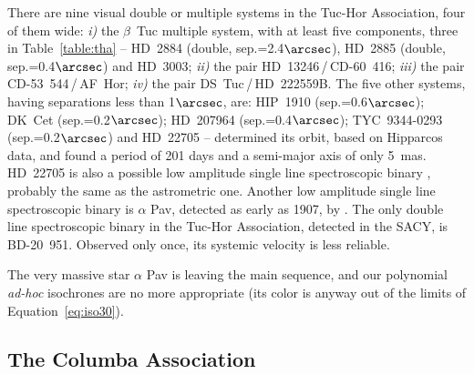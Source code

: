 \documentclass[11pt,twoside]{book}
\begin{document}
There are nine visual double or multiple systems in the Tuc-Hor Association, four of them wide:
{\it i)} the $\beta$~Tuc multiple system, with at least five components, three in Table~\ref{table:tha} --
HD~2884 (double, sep.=2.4$\arcsec$), HD~2885 (double, sep.=0.4$\arcsec$) and HD~3003;
{\it ii)} the pair HD~13246\,/\,CD-60~416;
{\it iii)} the pair CD-53~544\,/\,AF~Hor; {\it iv)} the pair DS~Tuc\,/\,HD~222559B.
The five other systems, having separations less than 1$\arcsec$, are: HIP~1910 (sep.=0.6$\arcsec$);
DK~Cet (sep.=0.2$\arcsec$);  HD~207964 (sep.=0.4$\arcsec$); TYC~9344-0293 (sep.=0.2$\arcsec$)
and HD~22705 --
\citet{makarov07} determined its orbit, based on Hipparcos data,
and found  a period of 201 days and a semi-major axis of only 5~mas.
HD~22705 is also a possible low amplitude single line spectroscopic binary \citep{nord04},
probably the same as the astrometric one.
Another low amplitude single line spectroscopic binary is $\alpha$ Pav,
detected as early as 1907, by \citet{curtis07}.
The only double line spectroscopic binary in the Tuc-Hor Association, detected in the SACY, is BD-20~951.
Observed only once, its systemic velocity is less reliable.

The very massive star $\alpha$ Pav is leaving the main sequence, and
our polynomial {\it ad-hoc} isochrones are no more appropriate (its
color is anyway out of the limits of Equation~\ref{eq:iso30}).

\subsection{The Columba Association}
\end{document}
